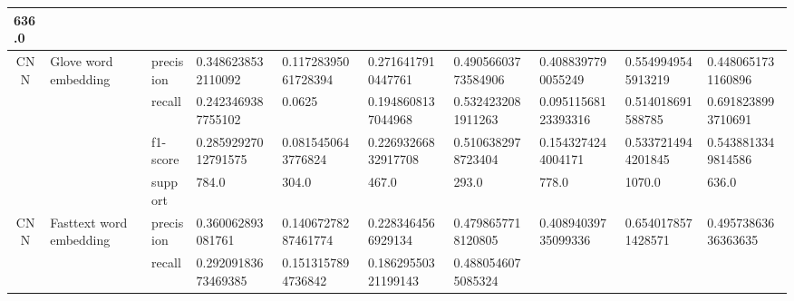 \begin{table}[h!]
{\begin{tabular}{@{}clllllllll@{}}
  \multicolumn{1}{l|}{636.0} \\ \midrule
\multicolumn{1}{|c|}{\multirow{4}{*}{CNN}} &
  \multicolumn{1}{l|}{\multirow{4}{*}{Glove word embedding}} &
  \multicolumn{1}{l|}{precision} &
  \multicolumn{1}{l|}{0.3486238532110092} &
  \multicolumn{1}{l|}{0.11728395061728394} &
  \multicolumn{1}{l|}{0.2716417910447761} &
  \multicolumn{1}{l|}{0.49056603773584906} &
  \multicolumn{1}{l|}{0.4088397790055249} &
  \multicolumn{1}{l|}{0.5549949545913219} &
  \multicolumn{1}{l|}{0.4480651731160896} \\ \cmidrule(l){3-10} 
\multicolumn{1}{|l|}{} &
  \multicolumn{1}{l|}{} &
  \multicolumn{1}{l|}{recall} &
  \multicolumn{1}{l|}{0.2423469387755102} &
  \multicolumn{1}{l|}{0.0625} &
  \multicolumn{1}{l|}{0.1948608137044968} &
  \multicolumn{1}{l|}{0.5324232081911263} &
  \multicolumn{1}{l|}{0.09511568123393316} &
  \multicolumn{1}{l|}{0.514018691588785} &
  \multicolumn{1}{l|}{0.6918238993710691} \\ \cmidrule(l){3-10} 
\multicolumn{1}{|l|}{} &
  \multicolumn{1}{l|}{} &
  \multicolumn{1}{l|}{f1-score} &
  \multicolumn{1}{l|}{0.28592927012791575} &
  \multicolumn{1}{l|}{0.0815450643776824} &
  \multicolumn{1}{l|}{0.22693266832917708} &
  \multicolumn{1}{l|}{0.5106382978723404} &
  \multicolumn{1}{l|}{0.1543274244004171} &
  \multicolumn{1}{l|}{0.5337214944201845} &
  \multicolumn{1}{l|}{0.5438813349814586} \\ \cmidrule(l){3-10} 
\multicolumn{1}{|l|}{} &
  \multicolumn{1}{l|}{} &
  \multicolumn{1}{l|}{support} &
  \multicolumn{1}{l|}{784.0} &
  \multicolumn{1}{l|}{304.0} &
  \multicolumn{1}{l|}{467.0} &
  \multicolumn{1}{l|}{293.0} &
  \multicolumn{1}{l|}{778.0} &
  \multicolumn{1}{l|}{1070.0} &
  \multicolumn{1}{l|}{636.0} \\ \midrule
\multicolumn{1}{|c|}{\multirow{4}{*}{CNN}} &
  \multicolumn{1}{l|}{\multirow{4}{*}{Fasttext word embedding}} &
  \multicolumn{1}{l|}{precision} &
  \multicolumn{1}{l|}{0.360062893081761} &
  \multicolumn{1}{l|}{0.14067278287461774} &
  \multicolumn{1}{l|}{0.2283464566929134} &
  \multicolumn{1}{l|}{0.4798657718120805} &
  \multicolumn{1}{l|}{0.40894039735099336} &
  \multicolumn{1}{l|}{0.6540178571428571} &
  \multicolumn{1}{l|}{0.49573863636363635} \\ \cmidrule(l){3-10} 
\multicolumn{1}{|c|}{} &
  \multicolumn{1}{l|}{} &
  \multicolumn{1}{l|}{recall} &
  \multicolumn{1}{l|}{0.29209183673469385} &
  \multicolumn{1}{l|}{0.1513157894736842} &
  \multicolumn{1}{l|}{0.18629550321199143} &
  \multicolumn{1}{l|}{0.4880546075085324} &

\end{tabular}}
\end{table}

